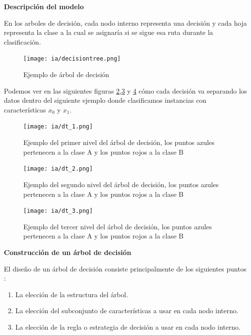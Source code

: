 \documentclass[11pt,fleqn]{book} %
\begin{document}
\clearpage

\textbf{Descripción del modelo}

En los arboles de decisión, cada nodo interno representa una decisión y cada hoja representa la clase a la cual se asignaría si se sigue esa ruta durante la clasificación.

\begin{figure}[ht]
\centering\texttt{[image: ia/decisiontree.png]}
\caption{Ejemplo de árbol de decisión}

\label{fig:decisiontree} 
\end{figure}

Podemos ver en las siguientes figuras \ref{fig:decisiontree_e1},\ref{fig:decisiontree_e2} y \ref{fig:decisiontree_e3} cómo cada decisión va separando los datos dentro del siguiente ejemplo donde clasificamos instancias con características $x_0$ y $x_1$.

\begin{figure}[ht]
\centering\texttt{[image: ia/dt\_1.png]}
\caption{Ejemplo del primer nivel del árbol de decisión, los puntos azules pertenecen a la clase A y los puntos rojos a la clase B}

\label{fig:decisiontree_e1} 
\end{figure}
\FloatBarrier
\begin{figure}[ht]
\centering\texttt{[image: ia/dt\_2.png]}
\caption{Ejemplo del segundo nivel del árbol de decisión, los puntos azules pertenecen a la clase A y los puntos rojos a la clase B}

\label{fig:decisiontree_e2} 
\end{figure}
\FloatBarrier
\begin{figure}[ht]
\centering\texttt{[image: ia/dt\_3.png]}
\caption{Ejemplo del tercer nivel del árbol de decisión, los puntos azules pertenecen a la clase A y los puntos rojos a la clase B}

\label{fig:decisiontree_e3} 
\end{figure}
\FloatBarrier

\textbf{Construcción de un árbol de decisión}

El diseño de un árbol de decisión consiste principalmente de los siguientes puntos \cite{dtc_survey}:

\begin{enumerate}
\item La elección de la estructura del árbol.
\item La elección del subconjunto de características a usar en cada nodo interno.
\item La elección de la regla o estrategia de decisión a usar en cada nodo interno. 
\end{enumerate}
\end{document}
